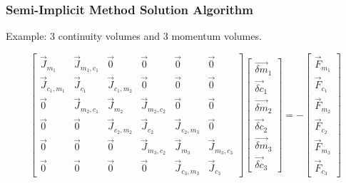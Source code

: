 \documentclass[compress,xcolor=table]{beamer}
\begin{document}
\begin{frame}
\frametitle{Semi-Implicit Method Solution Algorithm}

Example: 3 continuity volumes and 3 momentum volumes.

\begin{equation*}
\begin{bmatrix} 
\vec{J}_{m_1} & \vec{J}_{m_1,c_1} & \vec{0} & \vec{0} & \vec{0} & \vec{0}\\
\vec{J}_{c_1,m_1} & \vec{J}_{c_1} & \vec{J}_{c_1,m_2} & \vec{0} & \vec{0} & \vec{0} \\
\vec{0} & \vec{J}_{m_2,c_1} & \vec{J}_{m_2} & \vec{J}_{m_2,c_2} & \vec{0} & \vec{0} \\
\vec{0} & \vec{0} & \vec{J}_{c_2,m_2} & \vec{J}_{c_2} & \vec{J}_{c_2,m_3} & \vec{0} \\
\vec{0} & \vec{0} & \vec{0} & \vec{J}_{m_3,c_2} & \vec{J}_{m_3} & \vec{J}_{m_3,c_3} \\ 
\vec{0} & \vec{0} & \vec{0} & \vec{0} & \vec{J}_{c_3,m_3} & \vec{J}_{c_3}  
\end{bmatrix} \begin{bmatrix}
\vec{\delta m}_{1} \\ \vec{\delta c}_{1} \\
\vec{\delta m}_{2} \\ \vec{\delta c}_{2} \\
\vec{\delta m}_{3} \\ \vec{\delta c}_{3}
\end{bmatrix}  = -\begin{bmatrix}
\vec{F}_{m_1} \\ \vec{F}_{c_1} \\
\vec{F}_{m_2} \\ \vec{F}_{c_2} \\
\vec{F}_{m_3} \\ \vec{F}_{c_3} \end{bmatrix}
\end{equation*}

\end{frame}
\end{document}
